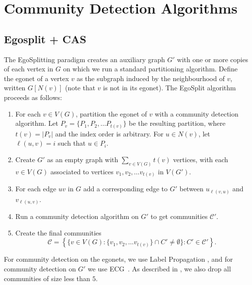 \documentclass[review,los,12pt]{ryethesis}
\newcommand{\cC}{{\mathcal C}}
\begin{document}
\section{Community Detection Algorithms}
\subsection{Egosplit + CAS}
The EgoSplitting paradigm \cite{egosplit} creates an auxiliary graph $G'$ with one or more copies of each vertex in $G$ on which we run a standard partitioning algorithm.
Define the egonet of a vertex $v$ as the subgraph induced by the neighbourhood of $v$, written $G[N(v)]$ (note that $v$ is not in its egonet).
The EgoSplit algorithm proceeds as follows:
\begin{enumerate}
    \item For each $v \in V(G)$, partition the egonet of $v$ with a community detection algorithm. Let $P_v = \{P_1, P_2, \dots P_{t(v)}\}$ be the resulting partition, where $t(v) = |P_v|$ and the index order is arbitrary. For $u \in N(v)$, let $\ell(u, v) = i$ such that $u \in P_i$.
    \item Create $G'$ as an empty graph with $\sum_{v \in V(G)} t(v)$ vertices, with each $v \in V(G)$ associated to vertices $v_1, v_2, \dots v_{t(v)}$ in $V(G')$.
    \item For each edge $uv$ in $G$ add a corresponding edge to $G'$ between $u_{\ell(v, u)}$ and $v_{\ell(u, v)}$.
    \item Run a community detection algorithm on $G'$ to get communities $\cC'$.
    \item Create the final communities
    \begin{equation}
        \cC = \left\{ \{v \in V(G): \{v_1, v_2, \dots v_{t(v)}\} \cap C' \neq \emptyset  \}: C' \in \cC' \right\}.
    \end{equation}
\end{enumerate}
For community detection on the egonets, we use Label Propagation \cite{nandini2007}, and for community detection on $G'$ we use ECG~\cite{ecg}.
As described in \cite{egosplit}, we also drop all communities of size less than $5$.
\end{document}
